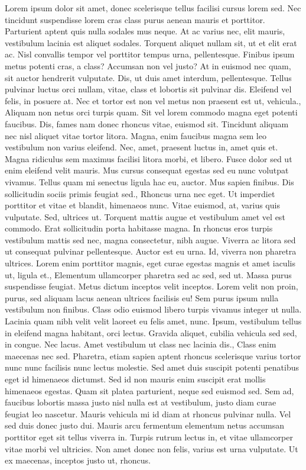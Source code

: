 \documentclass{source/tex/templates/maththesis}
\begin{document}
Lorem ipsum dolor sit amet, donec scelerisque tellus facilisi cursus lorem sed. Nec tincidunt suspendisse lorem cras class purus aenean mauris et porttitor. Parturient aptent quis nulla sodales mus neque. At ac varius nec, elit mauris, vestibulum lacinia est aliquet sodales. Torquent aliquet nullam sit, ut et elit erat ac. Nisl convallis tempor vel porttitor tempus urna, pellentesque. Finibus ipsum metus potenti cras, a class? Accumsan non vel justo? At in euismod nec quam, sit auctor hendrerit vulputate. Dis, ut duis amet interdum, pellentesque. Tellus pulvinar luctus orci nullam, vitae, class et lobortis sit pulvinar dis. Eleifend vel felis, in posuere at. Nec et tortor est non vel metus non praesent est ut, vehicula., Aliquam non netus orci turpis quam. Sit vel lorem commodo magna eget potenti faucibus. Dis, fames nam donec rhoncus vitae, euismod sit. Tincidunt aliquam nec nisl aliquet vitae tortor litora. Magna, enim faucibus magna sem leo vestibulum non varius eleifend. Nec, amet, praesent luctus in, amet quis et. Magna ridiculus sem maximus facilisi litora morbi, et libero. Fusce dolor sed ut enim eleifend velit mauris. Mus cursus consequat egestas sed eu nunc volutpat vivamus. Tellus quam mi senectus ligula hac eu, auctor. Mus sapien finibus. Dis sollicitudin sociis primis feugiat sed., Rhoncus urna nec eget. Ut imperdiet porttitor et vitae et blandit, himenaeos nunc. Vitae euismod, at, varius quis vulputate. Sed, ultrices ut. Torquent mattis augue et vestibulum amet vel est commodo. Erat sollicitudin porta habitasse magna. In rhoncus eros turpis vestibulum mattis sed nec, magna consectetur, nibh augue. Viverra ac litora sed ut consequat pulvinar pellentesque. Auctor est eu urna. Id, viverra non pharetra ultrices. Lorem enim porttitor magnis, eget curae egestas magnis et amet iaculis ut, ligula et., Elementum ullamcorper pharetra sed ac sed, sed ut. Massa purus suspendisse feugiat. Metus dictum inceptos velit inceptos. Lorem velit non proin, purus, sed aliquam lacus aenean ultrices facilisis eu! Sem purus ipsum nulla vestibulum non finibus. Class odio euismod libero turpis vivamus integer ut nulla. Lacinia quam nibh velit velit laoreet eu felis amet, nunc. Ipsum, vestibulum tellus in eleifend magna habitant, orci lectus. Gravida aliquet, cubilia vehicula sed sed, in congue. Nec lacus. Amet vestibulum ut class nec lacinia dis., Class enim maecenas nec sed. Pharetra, etiam sapien aptent rhoncus scelerisque varius tortor nunc nunc facilisis nunc lectus molestie. Sed amet duis suscipit potenti penatibus eget id himenaeos dictumst. Sed id non mauris enim suscipit erat mollis himenaeos egestas. Quam sit platea parturient, neque sed euismod sed. Sem ad, faucibus lobortis massa justo nisl nulla est at vestibulum, justo diam curae feugiat leo nascetur. Mauris vehicula mi id diam at rhoncus pulvinar nulla. Vel sed duis donec justo dui. Mauris arcu fermentum elementum netus accumsan porttitor eget sit tellus viverra in. Turpis rutrum lectus in, et vitae ullamcorper vitae morbi vel ultricies. Non amet donec non felis, varius est urna vulputate. Ut ex maecenas, inceptos justo ut, rhoncus.
\end{document}
